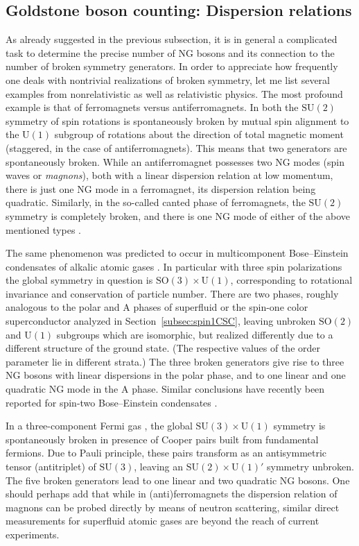 \documentclass[final,2p,times,12pt,sort&compress]{elsarticle}
\newcommand\gr[1]{\mathrm{#1}}              %
\begin{document}
\subsection{Goldstone boson counting: Dispersion relations}
\label{subsec:GBdispersions} As already suggested in the previous subsection,
it is in general a complicated task to determine the precise number of NG
bosons and its connection to the number of broken symmetry generators. In order
to appreciate how frequently one deals with nontrivial realizations of broken
symmetry, let me list several examples from nonrelativistic as well as
relativistic physics. The most profound example is that of ferromagnets versus
antiferromagnets. In both the $\gr{SU(2)}$ symmetry of spin rotations is
spontaneously broken by mutual spin alignment to the $\gr{U(1)}$ subgroup of
rotations about the direction of total magnetic moment (staggered, in the case
of antiferromagnets). This means that two generators are spontaneously broken.
While an antiferromagnet possesses two NG modes (spin waves or \emph{magnons}),
both with a linear dispersion relation at low momentum, there is just one NG
mode in a ferromagnet, its dispersion relation being quadratic. Similarly, in
the so-called canted phase of ferromagnets, the $\gr{SU(2)}$ symmetry is
completely broken, and there is one NG mode of either of the above mentioned
types \cite{Sachdev:1996sa}.

The same phenomenon was predicted to occur in multicomponent Bose--Einstein
condensates of alkalic atomic gases \cite{Ho:1998ho,Ohmi:1998om}. In particular
with three spin polarizations the global symmetry in question is
$\gr{SO(3)\times U(1)}$, corresponding to rotational invariance and conservation
of particle number. There are two phases, roughly analogous to the polar and A
phases of superfluid  or the spin-one color superconductor
analyzed in Section~\ref{subsec:spin1CSC}, leaving unbroken $\gr{SO(2)}$ and
$\gr{U(1)}$ subgroups which are isomorphic, but realized differently due to a
different structure of the ground state. (The respective values of the order
parameter lie in different strata.) The three broken generators give rise to
three NG bosons with linear dispersions in the polar phase, and to one linear
and one quadratic NG mode in the A phase. Similar conclusions have recently
been reported for spin-two Bose--Einstein condensates \cite{Uchino:2009ya}.

In a three-component Fermi gas
\cite{Honerkamp:2003hh,Honerkamp:2004ho,He:2006ne}, the global $\gr{SU(3)\times
U(1)}$ symmetry is spontaneously broken in presence of Cooper pairs built from
fundamental fermions. Due to Pauli principle, these pairs transform as an
antisymmetric tensor (antitriplet) of $\gr{SU(3)}$, leaving an $\gr{SU(2)\times
U(1)}'$ symmetry unbroken. The five broken generators lead to one linear and two
quadratic NG bosons. One should perhaps add that while in (anti)ferromagnets the
dispersion relation of magnons can be probed directly by means of neutron
scattering, similar direct measurements for superfluid atomic gases are beyond
the reach of current experiments.
\end{document}
